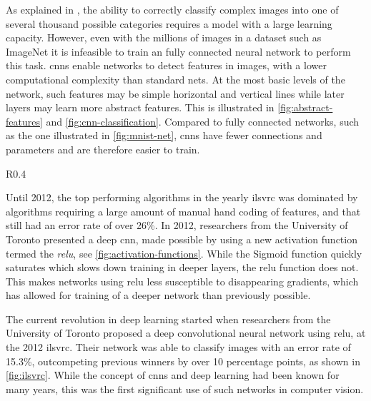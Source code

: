 \documentclass[\rootfolder/main.tex]{subfiles}
\begin{document}
As explained in \cite{Krizhevsky2012}, the ability to correctly classify complex images into one of several thousand possible categories requires a model with a large learning capacity.
However, even with the millions of images in a dataset such as ImageNet it is infeasible to train an fully connected neural network to perform this task.
\acrlong{cnn}s enable networks to detect features in images, with a lower computational complexity than standard nets.
At the most basic levels of the network, such features may be simple horizontal and vertical lines while later layers may learn more abstract features.
This is illustrated in \cref{fig:abstract-features} and \cref{fig:cnn-classification}.
Compared to fully connected networks, such as the one illustrated in \cref{fig:mnist-net}, \acrshort{cnn}s have fewer connections and parameters and are therefore easier to train.

\begin{wrapfigure}{R}{0.4\columnwidth}
    \caption{Illustration of Sigmoid and \acrshort{relu} activation functions.\label{fig:activation-functions}}
\end{wrapfigure}

Until 2012, the top performing algorithms in the yearly \acrfull{ilsvrc} was dominated by algorithms requiring a large amount of manual hand coding of features, and that still had an error rate of over 26\%.
In 2012, researchers from the University of Toronto presented a deep \acrshort{cnn}, made possible by using a new activation function termed the \emph{\acrfull{relu}}, see \cref{fig:activation-functions}.
While the Sigmoid function quickly saturates which slows down training in deeper layers, the \acrshort{relu} function does not.
This makes networks using \acrshort{relu} less susceptible to disappearing gradients, which has allowed for training of a deeper network than previously possible\cite{Krizhevsky2012}.

The current revolution in deep learning started when researchers from the University of Toronto proposed a deep convolutional neural network using \acrshort{relu}, at the 2012 \acrshort{ilsvrc}.
Their network was able to classify images with an error rate of 15.3\%, outcompeting previous winners by over 10 percentage points, as shown in \cref{fig:ilsvrc}.
While the concept of \acrlong{cnn}s and deep learning had been known for many years, this was the first significant use of such networks in computer vision.
\end{document}
